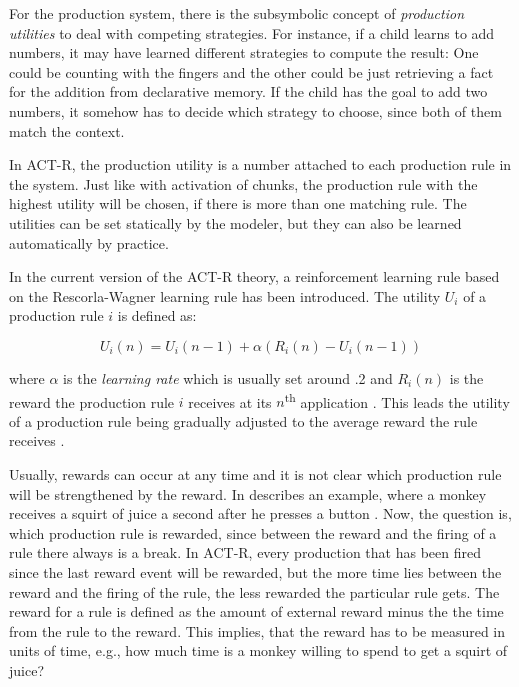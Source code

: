 For the production system, there is the subsymbolic concept of \emph{production utilities} to deal with competing strategies. For instance, if a child learns to add numbers, it may have learned different strategies to compute the result: One could be counting with the fingers and the other could be just retrieving a fact for the addition from declarative memory. If the child has the goal to add two numbers, it somehow has to decide which strategy to choose, since both of them match the context.

In ACT-R, the production utility is a number attached to each production rule in the system. Just like with activation of chunks, the production rule with the highest utility will be chosen, if there is more than one matching rule. The utilities can be set statically by the modeler, but they can also be learned automatically by practice.

In the current version of the ACT-R theory, a reinforcement learning rule based on the Rescorla-Wagner learning rule \cite{rescorla_wagner_1972} has been introduced. The utility $U_i$ of a production rule $i$ is defined as:

\begin{equation}
\label{eq:utility_learning}
U_i(n) = U_i(n - 1) + \alpha \left(R_i(n) - U_i(n - 1)\right)
\end{equation}

where $\alpha$ is the \emph{learning rate} which is usually set around .2 and $R_i(n)$ is the reward the production rule $i$ receives at its $n$\textsuperscript{th} application \cite[160--161]{anderson_how_2007}. This leads the utility of a production rule being gradually adjusted to the average reward the rule receives \cite[6--7]{actr_tutorial}. 

Usually, rewards can occur at any time and it is not clear which production rule will be strengthened by the reward. In  \citeauthor{anderson_how_2007} describes an example, where a monkey receives a squirt of juice a second after he presses a button \cite[161]{anderson_how_2007}. Now, the question is, which production rule is rewarded, since between the reward and the firing of a rule there always is a break. In ACT-R, every production that has been fired since the last reward event will be rewarded, but the more time lies between the reward and the firing of the rule, the less rewarded the particular rule gets. The reward for a rule is defined as the amount of external reward minus the the time from the rule to the reward. This implies, that the reward has to be measured in units of time, e.g., how much time is a monkey willing to spend to get a squirt of juice? \cite[161]{anderson_how_2007}

